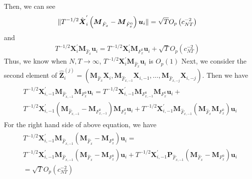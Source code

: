 \documentclass[12pt,a4paper,hyperref]{article}
\DeclarePairedDelimiter\norm{\lVert}{\rVert}%
\begin{document}
Then, we can see
\begin{align}
\norm{T^{-1/2} \hat{\boldsymbol{X}}^{'}_{i} \left(\boldsymbol{M}_{\hat{F}_{x}}-\boldsymbol{M}_{\hat{F}^{0}_{x}} \right) \boldsymbol{u}_{i}}= \sqrt{T}O_{p}\left( c^{-2}_{NT} \right)
\end{align}
and
\begin{align}
T^{-1/2} \boldsymbol{X}^{'}_{i}\boldsymbol{M}_{\hat{F}_{x}}\boldsymbol{u}_{i}=T^{-1/2} \boldsymbol{X}^{'}_{i}\boldsymbol{M}_{F^{0}_{x}}\boldsymbol{u}_{i}+\sqrt{T}O_{p}\left( c^{-2}_{NT} \right)
\end{align}
Thus, we know when $N,T \to \infty$, $T^{-1/2} \boldsymbol{X}^{'}_{i}\boldsymbol{M}_{\hat{F}_{x}}\boldsymbol{u}_{i}$ is $O_{p}\left( 1 \right)$
Next, we consider the second element of $\hat{\boldsymbol{Z}}^{(j)}_{i}=\left( \boldsymbol{M}_{\hat{F}_{x}}\boldsymbol{X}_{i}, \boldsymbol{M}_{\hat{F}_{x,-1}}\boldsymbol{X}_{i,-1},\ldots  ,\boldsymbol{M}_{\hat{F}_{x,-j}}\boldsymbol{X}_{i,-j} \right).$ Then we have
\begin{align}
\begin{split}
&T^{-1/2} \boldsymbol{X}^{'}_{i,-1} \boldsymbol{M}_{\hat{F}_{x,-1}}\boldsymbol{M}_{F^{0}_{x}} \boldsymbol{u}_{i}= T^{-1/2} \boldsymbol{X}^{'}_{i,-1} \boldsymbol{M}_{F^{0}_{x,-1}}\boldsymbol{M}_{F^{0}_{x}} \boldsymbol{u}_{i}+\\
&   T^{-1/2} \boldsymbol{X}^{'}_{i,-1} \left(\boldsymbol{M}_{\hat{F}_{x,-1}}- \boldsymbol{M}_{F^{0}_{x,-1}}  \right)\boldsymbol{M}_{F^{0}_{x}} \boldsymbol{u}_{i}+ T^{-1/2} \boldsymbol{X}^{'}_{i,-1} \boldsymbol{M}_{\hat{F}_{x,-1}} \left(\boldsymbol{M}_{\hat{F}_{x}}  \boldsymbol{M}_{F^{0}_{x}} \right) \boldsymbol{u}_{i}
\end{split}
\end{align}
 For the right hand side of above equation, we have 
\begin{align}
\begin{split}
& T^{-1/2} \boldsymbol{X}^{'}_{i,-1} \boldsymbol{M}_{\hat{F}_{x,-1}} \left(\boldsymbol{M}_{\hat{F}_{x}} - \boldsymbol{M}_{F^{0}_{x}} \right) \boldsymbol{u}_{i}= \\
 &T^{-1/2} \boldsymbol{X}^{'}_{i,-1} \boldsymbol{M}_{\hat{F}_{x,-1}} \left(\boldsymbol{M}_{\hat{F}_{x}}-  \boldsymbol{M}_{F^{0}_{x}} \right) \boldsymbol{u}_{i}+ T^{-1/2} \boldsymbol{X}^{'}_{i,-1} \boldsymbol{P}_{\hat{F}_{x,-1}} \left(\boldsymbol{M}_{\hat{F}_{x}}  -\boldsymbol{M}_{F^{0}_{x}} \right) \boldsymbol{u}_{i} \\
 &= \sqrt{T}O_{p}\left( c^{-2}_{NT} \right)
\end{split}
\end{align}
\end{document}
